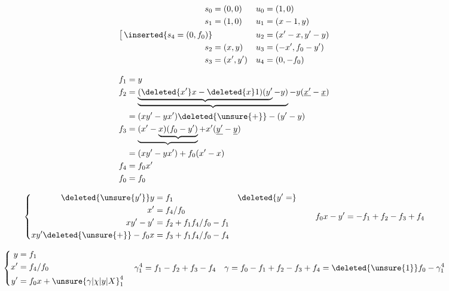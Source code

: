

\[
\begin{aligned}
s_0&=(0,0) & u_0&=(1,0)\\
s_1&=(1,0) & u_1&=(x-1,y)\\
\big[\,\inserted{s_4=(0,f_0)}& & u_2&=(x'-x,y'-y)\\
s_2&=(x,y) & u_3&=(-x',f_0-y')\\
s_3&=(x',y') & u_4&=(0,-f_0)
\end{aligned}
\]

\[
\begin{aligned}
f_1&=y\\
f_2&=\underbrace{\underbrace{(\deleted{x'}x-\deleted{x}1)(y'}-y)}-y(\underline{x'}-\underline{x})\\
&=(xy'-yx')\deleted{\unsure{+}}-(y'-y)\\
f_3&=\underbrace{(x'-\underbrace{x)(f_0-y')}}+x'(\underline{y'}-\underline{y})\\
&=(xy'-yx')+f_0(x'-x)\\
f_4&=f_0x'\\
f_0&=f_0
\end{aligned}
\]

\[
\left\{\begin{aligned}
\deleted{\unsure{y'}}y&=f_1 &&\deleted{y'=}\\
x'&=f_4/f_0\\
xy'-y'&=f_2+f_1f_4/f_0-f_1\\
xy'\deleted{\unsure{+}}-f_0x&=f_3+f_1f_4/f_0-f_4
\end{aligned}\right.
\qquad f_0x-y'=-f_1+f_2-f_3+f_4
\]

{\scriptsize
\[
\left\{\begin{aligned}
y&=f_1\\
x'&=f_4/f_0\\
y'&=f_0x+{\unsure{\gamma|\chi|y|X}}_1^4
\end{aligned}\right.
\quad \gamma_1^4=f_1-f_2+f_3-f_4
\quad \gamma=f_0-f_1+f_2-f_3+f_4=\deleted{\unsure{1}}f_0-\gamma_1^4
\]
}

